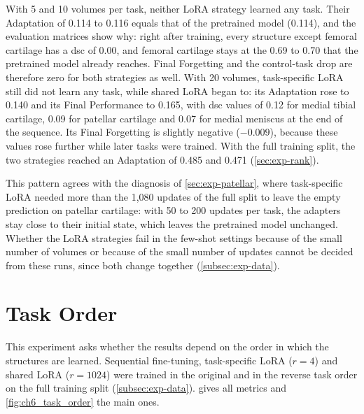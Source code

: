 With 5 and 10 volumes per task, neither LoRA strategy learned any task.
Their Adaptation of 0.114 to 0.116 equals that of the pretrained model (0.114), and the evaluation matrices show why: right after training, every structure except femoral cartilage has a \gls{dsc} of 0.00, and femoral cartilage stays at the 0.69 to 0.70 that the pretrained model already reaches.
Final Forgetting and the control-task drop are therefore zero for both strategies as well.
With 20 volumes, task-specific LoRA still did not learn any task, while shared LoRA began to: its Adaptation rose to 0.140 and its Final Performance to 0.165, with \gls{dsc} values of 0.12 for medial tibial cartilage, 0.09 for patellar cartilage and 0.07 for medial meniscus at the end of the sequence.
Its Final Forgetting is slightly negative ($-0.009$), because these values rose further while later tasks were trained.
With the full training split, the two strategies reached an Adaptation of 0.485 and 0.471 (\cref{sec:exp-rank}).

This pattern agrees with the diagnosis of \cref{sec:exp-patellar}, where task-specific LoRA needed more than the 1{,}080 updates of the full split to leave the empty prediction on patellar cartilage: with 50 to 200 updates per task, the adapters stay close to their initial state, which leaves the pretrained model unchanged.
Whether the LoRA strategies fail in the few-shot settings because of the small number of volumes or because of the small number of updates cannot be decided from these runs, since both change together (\cref{subsec:exp-data}).


\section{Task Order}
\label{sec:exp-task-order}
This experiment asks whether the results depend on the order in which the structures are learned.
Sequential fine-tuning, task-specific LoRA ($r = 4$) and shared LoRA ($r = 1024$) were trained in the original and in the reverse task order on the full training split (\cref{subsec:exp-data}).
 gives all metrics and \cref{fig:ch6_task_order} the main ones.

